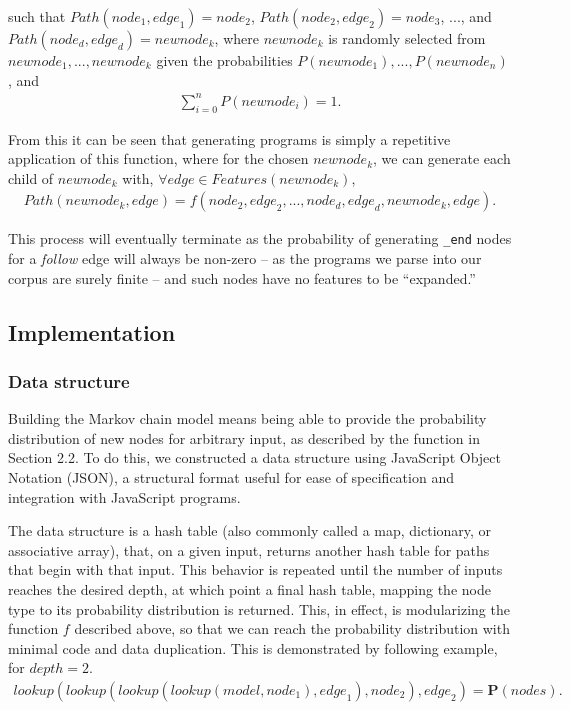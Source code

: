 \documentclass{article}
\begin{document}
such that ${Path}({node}_1, {edge}_1) = {node}_2$, ${Path}({node}_2, {edge}_2) = {node}_3$, ..., and ${Path}({node}_d, {edge}_d) = {newnode}_k$, where ${newnode}_k$ is randomly selected from ${newnode}_1, ..., {newnode}_k$ given the probabilities $P({newnode_1}), ..., P({newnode_n})$, and \begin{align*}
\sum\limits_{i = 0}^n P({newnode_i}) = 1.
\end{align*}

From this it can be seen that generating programs is simply a repetitive application of this function, where for the chosen ${newnode}_k$, we can generate each child of ${newnode}_k$ with, $\forall {edge} \in {Features}({newnode}_k)$, \begin{align*}
{Path}({newnode}_k, {edge}) = f({node}_2, {edge}_2, ..., {node}_{d}, {edge}_{d}, {newnode}_k, {edge}).
\end{align*}

This process will eventually terminate as the probability of generating {\tt \_end} nodes for a \emph{follow} edge will always be non-zero -- as the programs we parse into our corpus are surely finite -- and such nodes have no features to be ``expanded.''

\subsection{Implementation}

\subsubsection{Data structure}

Building the Markov chain model means being able to provide the probability distribution of new nodes for arbitrary input,
as described by the function in Section 2.2. To do this, we constructed a data structure using JavaScript Object Notation (JSON),
a structural format useful for ease of specification and integration with JavaScript programs.

The data structure is a hash table (also commonly called a map, dictionary, or associative array), that, on a given input, returns another hash table for paths that begin with that input. This behavior is repeated until the number of inputs reaches the desired depth, at which point a final hash table, mapping the node type to its probability distribution is returned. This, in effect, is modularizing the function $f$ described above, so that we can reach the probability distribution with minimal code and data duplication. This is demonstrated by following example, for  ${depth} = 2$. \begin{align*}
lookup(lookup(lookup(lookup({model}, {node}_1), {edge}_1), {node}_2), {edge}_2) = \textbf{P}({nodes}).
\end{align*}
\end{document}
